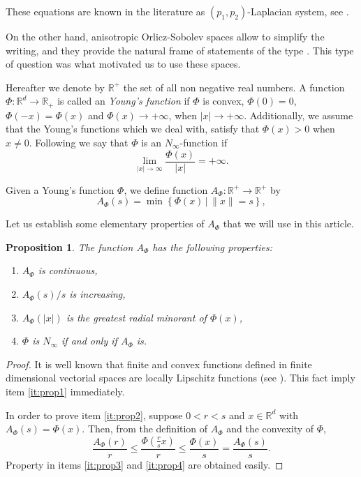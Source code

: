 \documentclass[twoside]{article}
\newtheorem{prop}[thm]{Proposition}
\theoremstyle{remark}
\newcommand{\rr}{\mathbb{R}}
\renewcommand{\leq}{\leqslant}
\begin{document}
These equations are known in the literature as $(p_1,p_2)$-Laplacian system, see
\cite{yang2013existence,pasca2016periodic,yang2012periodic,pasca2010periodic,pacsca2010some,pasca2011some}.


On the other hand, anisotropic Orlicz-Sobolev spaces allow to simplify the writing, and they provide the natural frame of statements of the type \cite[Lemma 3.1]{Tian2007192}. This type of question was what motivated us to use these spaces.

Hereafter we denote  by $\mathbb{R}^+$  the set of all non negative real numbers. A function $\Phi:\mathbb{R}^d\to \mathbb{R}_+ $ is called an \emph{Young's function} if $\Phi$ is convex, $\Phi(0)=0$, $\Phi(-x)=\Phi(x)$ and $\Phi(x)\to +\infty$, when $|x|\to+\infty$. Additionally, we assume that the Young's functions which we deal with, satisfy that $\Phi(x)>0$ when $x\neq 0$. Following \cite{Orliczvectorial2005} we say that $\Phi$ is an $N_{\infty}$-function  if
\[\lim_{|x|\to\infty}\frac{\Phi(x)}{|x|}=+\infty.\]

Given a Young's function $\Phi$, we define function $A_{\Phi}:\rr^+\to\rr^+$ by
\begin{equation}\label{eq:inversa-gral}
A_{\Phi}(s)=\min\left\{\Phi(x)\,\big|\,\|x\|=s\right\},
\end{equation}

Let us establish some elementary properties of $A_{\Phi}$ that we will use in this article.
\begin{prop}\label{prop:AsubPhi} The function $A_{\Phi}$ has the following properties:
\begin{enumerate}
 \item\label{it:prop1} $A_{\Phi}$ is continuous,
 \item\label{it:prop2} $A_{\Phi}(s)/s$ is increasing,
 \item\label{it:prop3} $A_{\Phi}(|x|)$ is the \emph{greatest radial minorant} of 
 $\Phi(x)$,
 \item\label{it:prop4} $\Phi$ is $N_{\infty}$ if and only if $A_{\Phi}$ is.
\end{enumerate}
\end{prop}

\begin{proof} It is well known that finite and convex functions defined in finite dimensional 
vectorial spaces are locally Lipschitz functions (see \cite{clarke2013functional}). This fact 
imply item \ref{it:prop1} immediately. 

In order to prove item \ref{it:prop2}, suppose $0<r<s$ and $x\in\rr^d$ with $A_{\Phi}(s)
=\Phi(x)$. Then, from the definition of $A_{\Phi}$ and the convexity of $\Phi$,
\[\frac{A_{\Phi}(r)}{r}\leq \frac{\Phi\left(\frac{r}{s}x\right)}{r}\leq \frac{\Phi\left(x\right)}{s}=
 \frac{A_{\Phi}(s)}{s}.
\]
Property in items \ref{it:prop3} and \ref{it:prop4} are obtained easily.

 
\end{proof}
\end{document}

